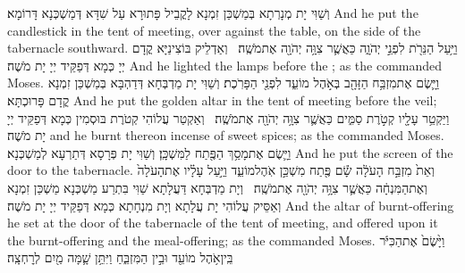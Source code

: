 {וְשַׁוִּי יָת מְנָרְתָא בְּמַשְׁכַּן זִמְנָא לָקֳבֵיל פָּתוּרָא עַל שִׁדָּא דְּמַשְׁכְּנָא דָּרוֹמָא׃}
{And he put the candlestick in the tent of meeting, over against the table, on the side of the tabernacle southward.}{}
{וַיַּ֥עַל הַנֵּרֹ֖ת לִפְנֵ֣י יְהֹוָ֑ה כַּאֲשֶׁ֛ר צִוָּ֥ה יְהֹוָ֖ה אֶת\maqqaf מֹשֶֽׁה׃ \setuma }
{וְאַדְלֵיק בּוֹצִינַיָּא קֳדָם יְיָ כְּמָא דְּפַקֵּיד יְיָ יָת מֹשֶׁה׃}
{And he lighted the lamps before the \lord; as the \lord\space commanded Moses.}{}
{וַיָּ֛שֶׂם אֶת\maqqaf מִזְבַּ֥ח הַזָּהָ֖ב בְּאֹ֣הֶל מוֹעֵ֑ד לִפְנֵ֖י הַפָּרֹֽכֶת׃}
{וְשַׁוִּי יָת מַדְבְּחָא דְּדַהְבָּא בְּמַשְׁכַּן זִמְנָא קֳדָם פָּרוּכְתָּא׃}
{And he put the golden altar in the tent of meeting before the veil;}{}
{וַיַּקְטֵ֥ר עָלָ֖יו קְטֹ֣רֶת סַמִּ֑ים כַּאֲשֶׁ֛ר צִוָּ֥ה יְהֹוָ֖ה אֶת\maqqaf מֹשֶֽׁה׃ \setuma }
{וְאַקְטַר עֲלוֹהִי קְטֹרֶת בּוּסְמִין כְּמָא דְּפַקֵּיד יְיָ יָת מֹשֶׁה׃}
{and he burnt thereon incense of sweet spices; as the \lord\space commanded Moses.}{}
{וַיָּ֛שֶׂם אֶת\maqqaf מָסַ֥ךְ הַפֶּ֖תַח לַמִּשְׁכָּֽן׃}
{וְשַׁוִּי יָת פְּרָסָא דְּתַרְעָא לְמַשְׁכְּנָא׃}
{And he put the screen of the door to the tabernacle.}{}
{וְאֵת֙ מִזְבַּ֣ח הָעֹלָ֔ה שָׂ֕ם פֶּ֖תַח מִשְׁכַּ֣ן אֹֽהֶל\maqqaf מוֹעֵ֑ד וַיַּ֣עַל עָלָ֗יו אֶת\maqqaf הָעֹלָה֙ וְאֶת\maqqaf הַמִּנְחָ֔ה כַּאֲשֶׁ֛ר צִוָּ֥ה יְהֹוָ֖ה אֶת\maqqaf מֹשֶֽׁה׃ \setuma }
{וְיָת מַדְבְּחָא דַּעֲלָתָא שַׁוִּי בִּתְרַע מַשְׁכְּנָא מַשְׁכַּן זִמְנָא וְאַסֵּיק עֲלוֹהִי יָת עֲלָתָא וְיָת מִנְחָתָא כְּמָא דְּפַקֵּיד יְיָ יָת מֹשֶׁה׃}
{And the altar of burnt-offering he set at the door of the tabernacle of the tent of meeting, and offered upon it the burnt-offering and the meal-offering; as the \lord\space commanded Moses.}{}
{וַיָּ֙שֶׂם֙ אֶת\maqqaf הַכִּיֹּ֔ר בֵּֽין\maqqaf אֹ֥הֶל מוֹעֵ֖ד וּבֵ֣ין הַמִּזְבֵּ֑חַ וַיִּתֵּ֥ן שָׁ֛מָּה מַ֖יִם לְרׇחְצָֽה׃}
